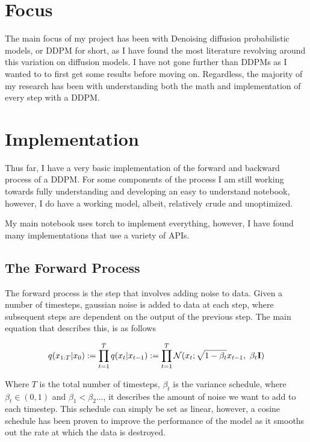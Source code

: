 \documentclass[conference]{IEEEtran}
\begin{document}
\section {Focus}

The main focus of my project has been with Denoising diffusion probabilistic models, or DDPM for short, as I have found the most literature revolving around this variation on diffusion models. I have not gone further than DDPMs as I wanted to to first get some results before moving on. Regardless, the majority of my research has been with understanding both the math and implementation of every step with a DDPM\cite{nain2022-2}\cite{nain2022-3}\cite{ho2020denoising}.

\section {Implementation}

Thus far, I have a very basic implementation of the forward and backward process of a DDPM. For some components of the process I am still working towards fully understanding and developing an easy to understand notebook, however, I do have a working model, albeit, relatively crude and unoptimized.

My main notebook uses torch to implement everything, however, I have found many implementations that use a variety of APIs.

\subsection{The Forward Process}

The forward process is the step that involves adding noise to data. Given a number of timesteps, gaussian noise is added to data at each step, where subsequent steps are dependent on the output of the previous step. The main equation that describes this, is as follows

$$
    q(x_{1:T}\vert x_{0})
    := \prod_{t=1}^{T}q(x_{t}\vert x_{t-1})
    :=\prod_{t=1}^{T}\mathcal{N}(x_{t};\sqrt{1-\beta_{t}} x_{t-1},\ \beta_{t}\bf I)
$$

Where $T$ is the total number of timesteps, $\beta_t$ is the variance schedule, where $\beta_t \in (0,1)$ and $\beta_{1} < \beta_{2}...$, it describes the amount of noise we want to add to each timestep. This schedule can simply be set as linear, however, a cosine schedule has been proven to improve the performance of the model\cite{nichol2021improved} as it smooths out the rate at which the data is destroyed.
\end{document}
